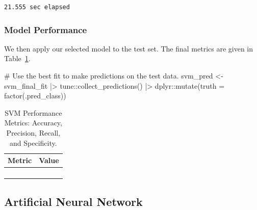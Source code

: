 \documentclass[
  letterpaper,
  DIV=11,
  numbers=noendperiod]{scrartcl}
\newenvironment{Shaded}{\begin{snugshade}}{\end{snugshade}}
\newcommand{\AttributeTok}[1]{\textcolor[rgb]{0.40,0.45,0.13}{#1}}
\newcommand{\CommentTok}[1]{\textcolor[rgb]{0.37,0.37,0.37}{#1}}
\newcommand{\FunctionTok}[1]{\textcolor[rgb]{0.28,0.35,0.67}{#1}}
\newcommand{\NormalTok}[1]{\textcolor[rgb]{0.00,0.23,0.31}{#1}}
\newcommand{\OtherTok}[1]{\textcolor[rgb]{0.00,0.23,0.31}{#1}}
\newcommand{\SpecialCharTok}[1]{\textcolor[rgb]{0.37,0.37,0.37}{#1}}
\begin{document}
\begin{verbatim}
21.555 sec elapsed
\end{verbatim}

\subsubsection{Model Performance}\label{model-performance-1}

We then apply our selected model to the test set. The final metrics are
given in Table~\ref{tbl-svm-performance-pdf}.

\begin{Shaded}
\begin{Highlighting}[]
\CommentTok{\# Use the best fit to make predictions on the test data.}
\NormalTok{svm\_pred }\OtherTok{\textless{}{-}} 
\NormalTok{  svm\_final\_fit }\SpecialCharTok{|\textgreater{}} 
\NormalTok{  tune}\SpecialCharTok{::}\FunctionTok{collect\_predictions}\NormalTok{() }\SpecialCharTok{|\textgreater{}}
\NormalTok{  dplyr}\SpecialCharTok{::}\FunctionTok{mutate}\NormalTok{(}\AttributeTok{truth =} \FunctionTok{factor}\NormalTok{(.pred\_class))}
\end{Highlighting}
\end{Shaded}

\begin{longtable}{>{\raggedright\arraybackslash}p{}>{\raggedleft\arraybackslash}p{}}

\caption{\label{tbl-svm-performance-pdf}SVM Performance Metrics:
Accuracy, Precision, Recall, and Specificity.}

\tabularnewline

\toprule
Metric & Value \\ 
\midrule\addlinespace[2.5pt]
\cellcolor[HTML]{FFFFFF}{Accuracy} & \cellcolor[HTML]{FFFFFF}{78.0} \\ 
\cellcolor[HTML]{FFFFFF}{Precision} & \cellcolor[HTML]{FFFFFF}{23.1} \\ 
\cellcolor[HTML]{FFFFFF}{Recall} & \cellcolor[HTML]{FFFFFF}{100.0} \\ 
\cellcolor[HTML]{FFFFFF}{Specificity} & \cellcolor[HTML]{FFFFFF}{76.5} \\ 
\bottomrule

\end{longtable}

\subsection{Artificial Neural Network}\label{artificial-neural-network}
\end{document}
